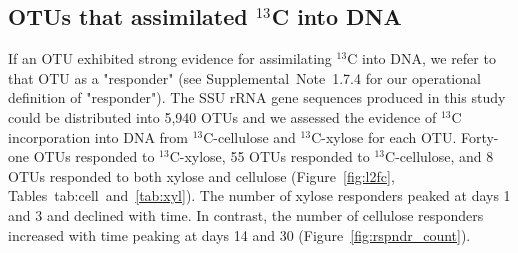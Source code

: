 \subsection{OTUs that assimilated $^{13}$C into DNA} \label{responders}
If an OTU exhibited strong evidence for assimilating $^{13}$C 
into DNA, we refer to that OTU as a "responder" (see Supplemental Note 1.7.4
for our operational definition of "responder"). The SSU rRNA gene sequences
produced in this study could be distributed into 5,940 OTUs and we assessed the
evidence of $^{13}$C incorporation into DNA from $^{13}$C-cellulose and
$^{13}$C-xylose for each OTU. Forty-one OTUs responded to $^{13}$C-xylose,
55 OTUs responded to $^{13}$C-cellulose, and 8 OTUs 
responded to both xylose and cellulose (Figure~\ref{fig:l2fc},
Tables~{tab:cell}~and~\ref{tab:xyl}). The number of xylose responders
peaked at days 1 and 3 and declined with time. In contrast, the number of
cellulose responders increased with time peaking at days 14 and 30
(Figure~\ref{fig:rspndr_count}). 

